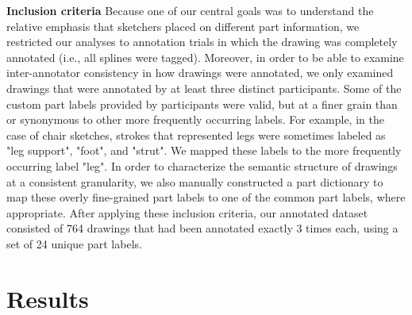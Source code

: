 \documentclass[10pt,letterpaper]{article}
\newcommand{\jefan}[1]{{\color{blue}{[jefan: #1]}}}
\begin{document}
\noindent \textbf{Inclusion criteria} \hspace{3mm} Because one of our central goals was to understand the relative emphasis that sketchers placed on different part information, we restricted our analyses to annotation trials in which the drawing was completely annotated (i.e., all splines were tagged). 
Moreover, in order to be able to examine inter-annotator consistency in how drawings were annotated, we only examined drawings that were annotated by at least three distinct participants. 
\jefan{By the way, are we including drawings that were annotated more than three times? We could, of course, and just ignore the 4th and onward... Also, have we ever checked whether the annotations were coming from distinct participants? Not sure, this requires comparing workerId, which we do not save to the group dataframe.}
Some of the custom part labels provided by participants were valid, but at a finer grain than or synonymous to other more frequently occurring labels. 
For example, in the case of chair sketches, strokes that represented legs were sometimes labeled as "leg support", "foot", and "strut". We mapped these labels to the more frequently occurring label "leg".
In order to characterize the semantic structure of drawings at a consistent granularity, we also manually constructed a part dictionary to map these overly fine-grained part labels to one of the common part labels, where appropriate. 
After applying these inclusion criteria, our annotated dataset consisted of 764 drawings that had been annotated exactly 3 times each, using a set of 24 unique part labels. 


\section{Results}
\end{document}
